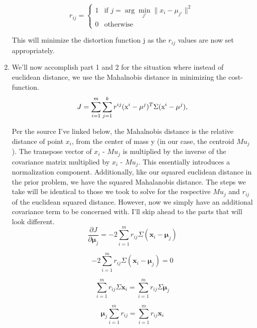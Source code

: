 \documentclass{article}
\begin{document}
\begin{enumerate}
\begin{equation}
r_{ij} =
\begin{cases}
1 & \text{if } j = \arg \min_{j'} \| x_i - \mu_{j'} \|^2 \\
0 & \text{otherwise}
\end{cases}
\end{equation}

This will minimize the distortion function j as the $r_{ij}$ values are now set appropriately.

\item We'll now accomplish part 1 and 2 for the situation where instead of euclidean distance,
we use the Mahalnobis distance in minimizing the cost-function.
\begin{equation}
J =\sum_{i=1}^m\sum_{j=1}^k r^{ij} (\text x^i-\mu^j)^T \Sigma  (\text x^i-\mu^j),
\end{equation}

Per the source I've linked below, the Mahalnobis distance is the relative distance of point $x_i$, from the center
of mass y (in our case, the centroid $Mu_j$). The transpose vector of $x_i$ - $Mu_j$ is multiplied by the
inverse of the covariance matrix multiplied by $x_i$ - $Mu_j$. This essentially introduces a normalization
component. Additionally, like our squared euclidean distance in the prior problem, we have the squared
Mahalanobis distance. The steps we take will be identical to those we took to solve for the
respective $Mu_j$ and $r_{ij}$ of the euclidean squared distance. However, now we simply have an additional
covariance term to be concerned with. I'll skip ahead to the parts that will look different.
\begin{equation}
\frac{\partial J}{\partial \boldsymbol{\mu}_j} = -2 \sum_{i=1}^{m} r_{ij} \Sigma (\mathbf{x}_i - \boldsymbol{\mu}_j)
\end{equation}

\begin{equation}
-2 \sum_{i=1}^{m} r_{ij} \Sigma (\mathbf{x}_i - \boldsymbol{\mu}_j) = 0
\end{equation}

\begin{equation}
\sum_{i=1}^{m} r_{ij} \Sigma \mathbf{x}_i = \sum_{i=1}^{m} r_{ij} \Sigma \boldsymbol{\mu}_j
\end{equation}

\begin{equation}
\boldsymbol{\mu}_j \sum_{i=1}^{m} r_{ij} = \sum_{i=1}^{m} r_{ij} \mathbf{x}_i
\end{equation}


\end{enumerate}
\end{document}

